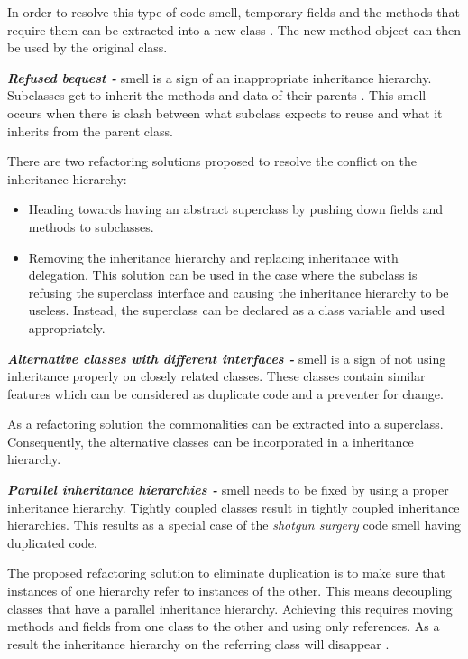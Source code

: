 In order to resolve this type of code smell, temporary fields and the methods that require them can be extracted into a new class \cite{fowlerRefactor}. The new method object can then be used by the original class. 

\textit{\textbf{Refused bequest -}} smell is a sign of an inappropriate inheritance hierarchy. Subclasses get to inherit the methods and data of their parents \cite{fowlerRefactor}. This smell occurs when there is clash between what subclass expects to reuse and what it inherits from the parent class.

There are two refactoring solutions proposed to resolve the conflict on the inheritance hierarchy:

\begin{itemize}
\item Heading towards having an abstract superclass by pushing down fields and methods to subclasses.
\item Removing the inheritance hierarchy and replacing inheritance with delegation. This solution can be used in the case where the subclass is refusing the superclass interface and causing the inheritance hierarchy to be useless. Instead, the superclass can be declared as a class variable and used appropriately. 
\end{itemize}

\textit{\textbf{Alternative classes with different interfaces -}} smell is a sign of not using inheritance properly on closely related classes. These classes contain similar features which can be considered as duplicate code and a preventer for change.

As a refactoring solution the commonalities can be extracted into a superclass. Consequently, the alternative classes can be incorporated in a inheritance hierarchy.

\textit{\textbf{Parallel inheritance hierarchies -}} smell needs to be fixed by using a proper inheritance hierarchy. Tightly coupled classes result in tightly coupled inheritance hierarchies. This results as a special case of the \textit{shotgun surgery} code smell having duplicated code\cite{fowlerRefactor}. 

The proposed refactoring solution to eliminate duplication is to make sure that instances of one hierarchy refer to instances of the other. This means decoupling classes that have a parallel inheritance hierarchy. Achieving this requires moving methods and fields from one class to the other and using only references. As a result the inheritance hierarchy on the referring class will disappear \cite{fowlerRefactor}.  

